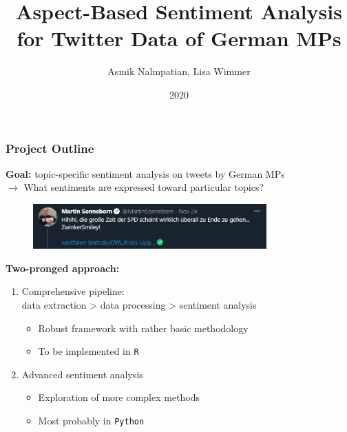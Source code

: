 \documentclass[t]{beamer}
\title{Aspect-Based Sentiment Analysis for Twitter Data of German MPs}
\author{Asmik Nalmpatian, Lisa Wimmer}
\institute{Statistical Consulting}
\date{2020}
\newcommand{\highlight}[1]{\colorbox{gray!20}{#1}}
\begin{document}


\frame{\titlepage}

\footnotesize


\begin{frame}
\frametitle{Project Outline}

\textbf{Goal:} \highlight{topic-specific sentiment analysis} on
tweets by German MPs \\
\smallskip
$\rightarrow$ What sentiments are expressed toward particular topics? \\
  
\begin{figure}
  \raggedright
  \includegraphics[width = 0.8\textwidth]{figures/screenshot_tweet.PNG}
\end{figure}

\textbf{Two-pronged approach:}
\begin{enumerate}
  \footnotesize
  \item Comprehensive \highlight{pipeline}: \\
  data extraction > data processing > sentiment analysis
  \begin{itemize}
    \footnotesize
    \item Robust framework with rather basic methodology
    \item To be implemented in \texttt{R}
  \end{itemize}
  \item \highlight{Advanced} sentiment analysis
  \begin{itemize}
    \footnotesize
    \item Exploration of more complex methods
    \item Most probably in \texttt{Python}
  \end{itemize}
\end{enumerate}

\end{frame}

\end{document}
